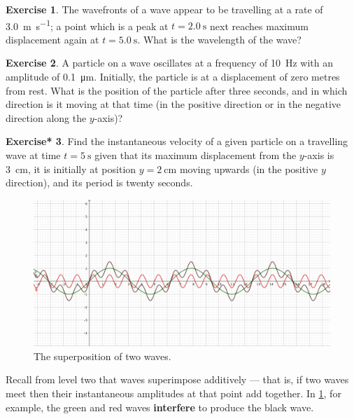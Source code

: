 \documentclass[a4paper]{amsbook}
\theoremstyle{definition}
\newtheorem{exercise}{Exercise}
\numberwithin{exercise}{chapter}
\newtheorem{exercise*}[exercise]{Exercise*}
\numberwithin{exercise}{chapter}
\begin{document}
\begin{exercise}
  The wavefronts of a wave appear to be travelling at a rate of \SI{3.0}{\metre\per\second}; a point which is a
  peak at $ t = \SI{2.0}{\second} $ next reaches maximum displacement again at $ t = \SI{5.0}{\second} $. What is
  the wavelength of the wave?
\end{exercise}

\begin{exercise}
  A particle on a wave oscillates at a frequency of \SI{10}{\hertz} with an amplitude of \SI{0.1}{\micro\metre}. Initially,
  the particle is at a displacement of zero metres from rest. What is the position of the particle after three seconds, and
  in which direction is it moving at that time (in the positive direction or in the negative direction along the $ y$-axis)?
\end{exercise}

\begin{exercise*}
  Find the instantaneous velocity of a given particle on a travelling wave at time $ t = \SI{5}{\second} $ given that its
  maximum displacement from the $ y$-axis is \SI{3}{\centi\metre}, it is initially at position $ y = \SI{2}{\centi\metre} $
  moving upwards (in the positive $ y$ direction), and its period is twenty seconds.
\end{exercise*}

\begin{figure}
  \centering
  \includegraphics[width=\textwidth]{superposition}
  \caption{The superposition of two waves.}\label{fig:superposition}
\end{figure}
Recall from level two that waves superimpose additively --- that is, if two waves meet then their instantaneous amplitudes at that point
add together. In \cref{fig:superposition}, for example, the green and red waves \textbf{interfere} to produce the black wave.
\end{document}
